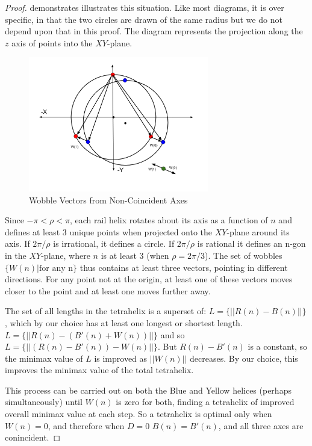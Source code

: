 \documentclass[review]{siamonline1116}
\begin{document}
\begin{proof}
   demonstrates illustrates this situation. Like most diagrams, it is
  over specific, in that the two circles are drawn of the same radius but we do not
  depend upon that in this proof.  The diagram represents the projection along the
  $z$ axis of points into the $XY$-plane.

  \begin{figure}[H]
     \centering
     \includegraphics[width=0.7\textwidth]{figures/WobbleDiagram.png}
     \caption{Wobble Vectors from Non-Coincident Axes}
  \label{fig:wobble}
\end{figure}
  
  Since $-\pi<\rho<\pi$, each rail helix rotates about its axis as a function of $n$ and
  defines at least 3 unique points when projected onto the $XY$-plane around its axis.
  If $2\pi/\rho$ is irrational, it defines a circle. If $2\pi/\rho$ is rational it defines
  an n-gon in the $XY$-plane, where $n$ is at least 3 (when $\rho = 2\pi/3$).
  The set of wobbles $\{W(n) | \text{for any n}\}$ thus contains at least three vectors,
  pointing in different directions.
  For any point not at the origin, at least one of these vectors moves closer to the
  point and at least one moves further away.

    The set of all lengths in the tetrahelix is a superset of:
    $L = \{|| R(n) - B(n)||\}$, which by our choice has at least one longest or shortest
    length.
    $L = \{|| R(n) - (B'(n) + W(n))||\}$ and so
    $L = \{|| (R(n) - B'(n)) - W(n)||\}$.
    But $R(n) - B'(n)$ is a constant, so the minimax value of $L$ is improved as $||W(n)||$
    decreases.  
    By our choice, this improves the minimax value of the total tetrahelix.
    
    This process can be carried out on both the Blue and Yellow helices
    (perhaps simultaneously) until $W(n)$ is
    zero for both, finding a tetrahelix of improved overall minimax value at each step.
    So a tetrahelix is optimal only when $W(n) = 0$, and therefore when $D=0$
    $B(n) = B'(n)$, and all three axes are conincident.
\end{proof}
\end{document}
